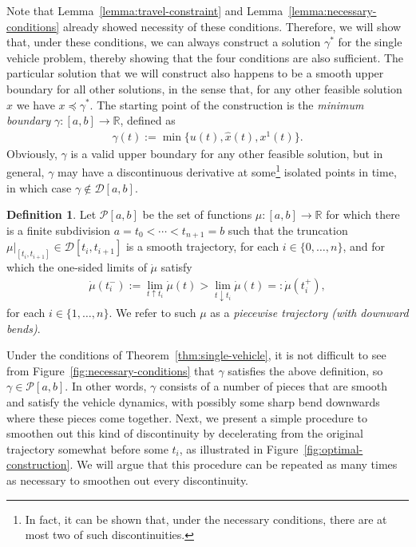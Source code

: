 \documentclass{report}
\theoremstyle{definition}
\newtheorem{define}{Definition}[chapter]
\theoremstyle{plain}
\begin{document}
Note that Lemma~\ref{lemma:travel-constraint} and Lemma~\ref{lemma:necessary-conditions} already showed
necessity of these conditions.
%
Therefore, we will show that, under these conditions, we can always construct a
solution $\gamma^{*}$ for the single vehicle problem, thereby showing that the
four conditions are also sufficient.
%
The particular solution that we will construct also happens to be a smooth upper
boundary for all other solutions, in the sense that, for any other feasible
solution $x$ we have $x \preceq \gamma^{*}$.
%
The starting point of the construction is the \emph{minimum boundary}
$\gamma : [a,b] \rightarrow \mathbb{R}$, defined as
\begin{align}\label{eq:min-boundary}
  \gamma(t) := \min \{ u(t), \hat{x}(t), x^{1}(t) \} .
\end{align}
%
Obviously, $\gamma$ is a valid upper boundary for any other feasible solution,
%
but in general, $\gamma$ may have a discontinuous derivative at some\footnote{In fact, it can be shown that, under the necessary conditions, there are at most two of such discontinuities.} isolated
points in time, in which case $\gamma \notin \mathcal{D}[a,b]$.

\begin{define}\label{def:piecewise-trajectory}
  Let $\mathcal{P}[a,b]$ be the set of functions $\mu : [a, b] \rightarrow \mathbb{R}$ for
  which there is a finite subdivision $a = t_{0} < \cdots < t_{n+1} = b$ such that
  the truncation $\mu|_{[t_{i}, t_{i+1}]} \in \mathcal{D}[t_{i}, t_{i+1}]$ is
  a smooth trajectory, for each $i \in \{0, \dots, n\}$, and for which the one-sided limits of $\dot{\mu}$ satisfy
  \begin{align}
    \dot{\mu}(t_{i}^{-}) := \lim_{t \uparrow t_{i}} \dot{\mu}(t) > \lim_{t \downarrow t_{i}} \dot{\mu}(t) =: \dot{\mu}(t_{i}^{+}) ,
  \end{align}
  for each $i \in \{1, \dots, n\}$. We refer to such $\mu$ as a \emph{piecewise
    trajectory (with downward bends)}.
\end{define}

Under the conditions of Theorem~\ref{thm:single-vehicle}, it is not difficult to
see from Figure~\ref{fig:necessary-conditions} that $\gamma$ satisfies the above definition, so
$\gamma \in \mathcal{P}[a,b]$. In other words, $\gamma$ consists of a number of pieces that
are smooth and satisfy the vehicle dynamics, with possibly some sharp bend
downwards where these pieces come together.
%
Next, we present a simple procedure to smoothen out this kind of discontinuity
by decelerating from the original trajectory somewhat before some $t_{i}$, as
illustrated in Figure~\ref{fig:optimal-construction}. We will argue that this procedure can be repeated as
many times as necessary to smoothen out every discontinuity.
\end{document}
